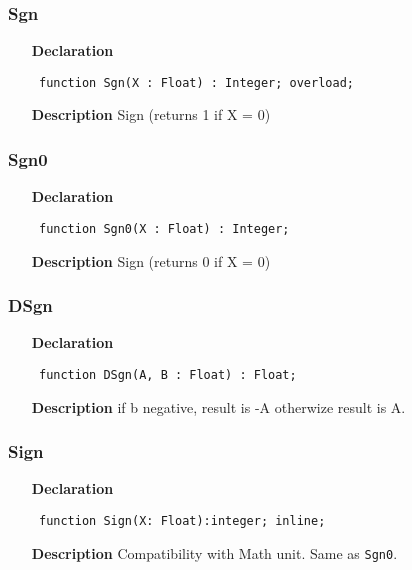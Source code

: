 \documentclass[12pt,a4paper,oneside]{report}
\newcommand{\lmath}[1]{   %
	\marginpar{\vspace{#1} 
		\begin{flushright}
			LMath
	\end{flushright} }
}
\newcommand{\declarationitem}[1]{\textbf{#1}}
\newcommand{\descriptiontitle}[1]{\textbf{#1}}
\newcommand{\code}[1]{\texttt{#1}}
\begin{document}
\subsubsection{Sgn}
\label{uminmax-Sgn}
\begin{itemize}\item[\declarationitem{Declaration}\hfill]
	\begin{flushleft}
		\code{
			function Sgn(X : Float) : Integer; overload;}
	\end{flushleft}
	\item[\descriptiontitle{Description}]
	Sign (returns 1 if X = 0)
\end{itemize}
\subsubsection{Sgn0}
\label{uminmax-Sgn0}
\begin{itemize}\item[\declarationitem{Declaration}\hfill]
	\begin{flushleft}
		\code{
			function Sgn0(X : Float) : Integer;}
	\end{flushleft}
	\item[\descriptiontitle{Description}]
	Sign (returns 0 if X = 0)	
\end{itemize}
\subsubsection{DSgn}
\label{uminmax-DSgn}
\begin{itemize}\item[\declarationitem{Declaration}\hfill]
	\begin{flushleft}
		\code{
			function DSgn(A, B : Float) : Float;}
	\end{flushleft}
	\par
	\item[\descriptiontitle{Description}]
	 if b negative, result is -A otherwize result is A.
\end{itemize}
\subsubsection{Sign}
\lmath{-24pt}
\label{uminmax-Sign}
\begin{itemize}\item[\declarationitem{Declaration}\hfill]
	\begin{flushleft}
		\code{
			function Sign(X: Float):integer; inline;}
	\end{flushleft}
	\item[\descriptiontitle{Description}]
	Compatibility with Math unit. Same as \code{Sgn0}. 
\end{itemize}
\end{document}
